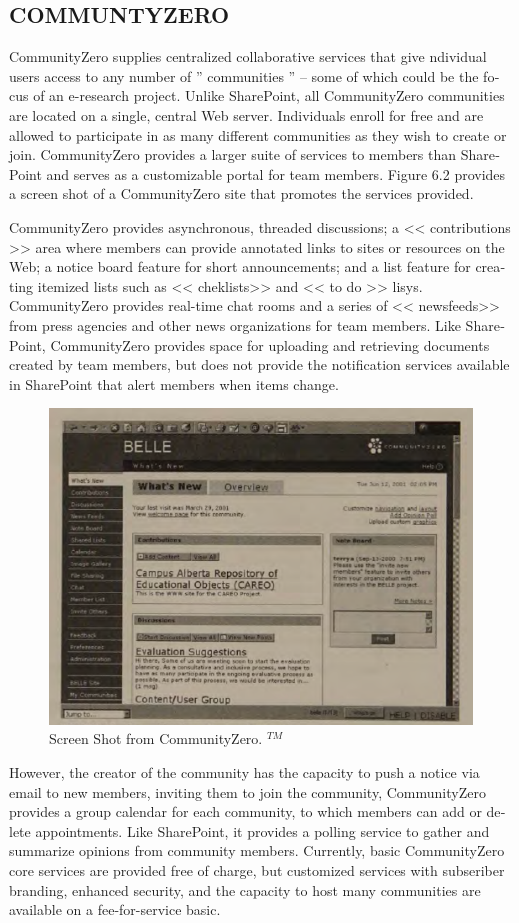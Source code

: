 \begin{latin}
\section*{COMMUNTYZERO}
CommunityZero supplies centralized collaborative services that give ndividual users access to any  number of  '' communities '' -- some of which could be the focus of an e-research project. Unlike SharePoint, all CommunityZero communities are  located on a single, central Web server. Individuals enroll  for  free and are allowed to participate in as  many different communities as  they  wish to create  or join. CommunityZero provides a larger suite of services to members than SharePoint and  serves as a customizable portal for team members. Figure 6.2 provides a screen  shot of a CommunityZero site that promotes the services provided.

CommunityZero provides asynchronous, threaded discussions; a << contributions >> area where members can provide annotated links to sites or resources on the  Web; a notice board feature for short announcements; and a list feature for creating itemized lists such as << cheklists>> and << to do >> lisys. CommunityZero provides  real-time chat rooms and a series of << newsfeeds>> from press agencies and other news organizations for team members. Like SharePoint, CommunityZero provides space for uploading and retrieving documents created by team members, but does not provide the notification services available in SharePoint that alert members when items change.
\begin{figure}[H]
\centering
 \includegraphics*[scale=1]{2}
\caption{ Screen Shot from CommunityZero. ${}^{TM}$}
\end{figure}
However, the creator of the community has the capacity to push a notice via email to new members, inviting them to join the community, CommunityZero provides a group calendar for each  community, to which members can add or delete appointments. Like SharePoint, it provides a polling service to gather and summarize opinions from community members. Currently, basic CommunityZero core services are provided free of charge, but customized services with subseriber branding, enhanced security, and the capacity to host many communities are available on a fee-for-service basic.

\end{latin}
